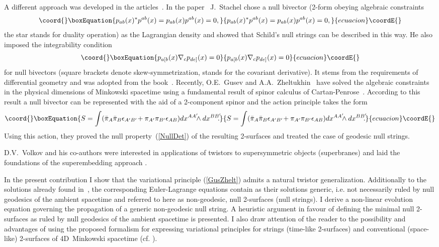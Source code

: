 \documentclass[a4paper,twocolumn,showkeys,showpacs,aps]{revtex4}
\begin{document}
A different approach was developed in the
articles~\cite{Stachel,Gusev-Zheltukhin}. In the
paper~\cite{Stachel} J.~Stachel chose a null bivector (2-form
obeying algebraic constraints
\begin{equation}\coord{}\boxEquation{
p_{ab}(x){}^*p^{ab}(x)=p_{ab}(x)p^{ab}(x)=0,
}{
p_{ab}(x){}^*p^{ab}(x)=p_{ab}(x)p^{ab}(x)=0,
}{ecuacion}\coordE{}\end{equation}
the star stands for duality operation) as the Lagrangian density
and showed that Schild's null strings can be described in this
way. He also imposed the integrability condition
\begin{equation}\coord{}\boxEquation{
p_{a[b}(x)\nabla_{c}p_{de]}(x)=0
\label{DiffCon}
}{
p_{a[b}(x)\nabla_{c}p_{de]}(x)=0
}{ecuacion}\coordE{}\end{equation}
for null bivectors (square brackets denote
skew-sym\-met\-ri\-za\-tion, \coordHE{} stands for the covariant
de\-ri\-va\-ti\-ve). It stems from the requirements of
differential geometry and was adopted from the
book~\cite{Schouten}. Recently, O.E.~Gusev and
A.A.~Zheltukhin~\cite{Gusev-Zheltukhin} have solved the algebraic
constraints in the physical dimensions of Minkowski spacetime
using a fundamental result of spinor calculus of
Cartan-Penrose~\cite[Vol. 1]{SST}. According to this result a null
bivector can be represented with the aid of a 2-component spinor
and the action principle takes the form
\begin{equation}\coord{}\boxEquation{
S = \int (\bar{\pi}_{A}\bar{\pi}_{B}\epsilon_{A'B'}\! +
\pi_{A'}\pi_{B'}\epsilon_{AB}) dx^{AA'}\!\!\! \wedge
dx^{BB'}\!\!\!.
\label{GusZhelt}
}{
S = \int (\bar{\pi}_{A}\bar{\pi}_{B}\epsilon_{A'B'}\! +
\pi_{A'}\pi_{B'}\epsilon_{AB}) dx^{AA'}\!\!\! \wedge
dx^{BB'}\!\!\!.
}{ecuacion}\coordE{}\end{equation}
Using this action, they proved the null property~(\ref{NullDet})
of the resulting 2-surfaces and treated the case of geodesic null
strings.

D.V.~Volkov and his co-authors were interested in applications of
twistors to supersymmetric  objects (superbranes) and laid the
foundations of the superembedding approach
\cite{Volkov:1988vf,Sorokin:1989zi,Sorokin:1989nj}.

In the present contribution I show that the variational principle
(\ref{GusZhelt}) admits a natural twistor generalization.
Additionally to the solutions already found
in~\cite{Gusev-Zheltukhin}, the corresponding Euler-Lagrange
equations contain as their solutions generic, i.e. not necessarily
ruled by null geodesics of the ambient spacetime and referred to
here as non-geodesic, null 2-surfaces (null strings). I derive a
non-linear evolution equation governing the propagation of a
generic non-geodesic null string. A heuristic argument in favour
of defining the minimal null 2-surfaces as ruled by null geodesics
of the ambient spacetime is presented. I also draw attention of
the reader to the possibility and advantages of using the proposed
formalism for expressing variational principles for strings
(time-like 2-surfaces) and conventional (space-like) 2-surfaces of
4D~Minkowski spacetime (cf. \cite{Gusev-Zheltukhin}).
\end{document}

